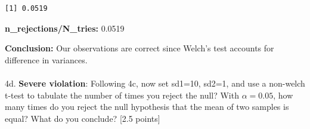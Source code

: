 \documentclass[
  letterpaper,
  DIV=11,
  numbers=noendperiod]{scrartcl}
\makeatletter
\let\oldparagraph\paragraph
\renewcommand{\paragraph}{
    \@ifstar
      \xxxParagraphStar
      \xxxParagraphNoStar
  }
\newcommand{\xxxParagraphStar}[1]{\oldparagraph*{#1}\mbox{}}
\newcommand{\xxxParagraphNoStar}[1]{\oldparagraph{#1}\mbox{}}
\makeatother
\begin{document}
\begin{verbatim}
[1] 0.0519
\end{verbatim}

\textbf{n\_rejections/N\_tries:} 0.0519

\textbf{Conclusion:} Our observations are correct since Welch's test
accounts for difference in variances.

\paragraph{\texorpdfstring{4d. \textbf{Severe violation}: Following 4c,
now set sd1=10, sd2=1, and use a non-welch t-test to tabulate the number
of times you reject the null? With \(\alpha=0.05\), how many times do
you reject the null hypothesis that the mean of two samples is equal?
What do you conclude? {[}2.5
points{]}}{4d. Severe violation: Following 4c, now set sd1=10, sd2=1, and use a non-welch t-test to tabulate the number of times you reject the null? With \textbackslash alpha=0.05, how many times do you reject the null hypothesis that the mean of two samples is equal? What do you conclude? {[}2.5 points{]}}}\label{d.-severe-violation-following-4c-now-set-sd110-sd21-and-use-a-non-welch-t-test-to-tabulate-the-number-of-times-you-reject-the-null-with-alpha0.05-how-many-times-do-you-reject-the-null-hypothesis-that-the-mean-of-two-samples-is-equal-what-do-you-conclude-2.5-points}
\end{document}
